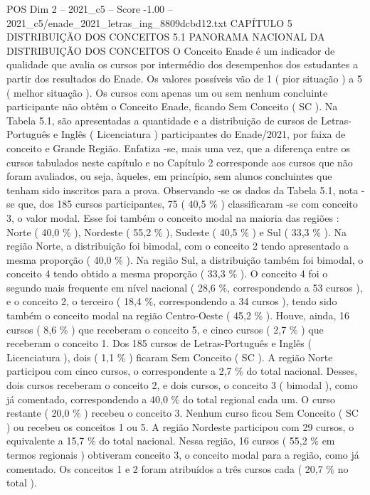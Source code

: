 \begin{textsample}{POS Dim 2 – 2021\_c5 – Score -1.00 – 2021\_c5/enade\_2021\_letras\_ing\_8809dcbd12.txt}  \label{ex:f2_pos_290}
CAPÍTULO 5 DISTRIBUIÇÃO DOS CONCEITOS 5.1 PANORAMA NACIONAL DA DISTRIBUIÇÃO DOS CONCEITOS O Conceito Enade é um indicador de qualidade que avalia os cursos por intermédio dos desempenhos dos estudantes a partir dos resultados do Enade.
Os valores possíveis vão de 1 ( pior situação ) a 5 ( melhor situação ).
Os cursos com apenas um ou sem nenhum concluinte participante não obtêm o Conceito Enade, ficando Sem Conceito ( SC ).
Na Tabela 5.1, são apresentadas a quantidade e a distribuição de cursos de Letras-Português e Inglês ( Licenciatura ) participantes do Enade/2021, por faixa de conceito e Grande Região.
Enfatiza -se, mais uma vez, que a diferença entre os cursos tabulados neste capítulo e no Capítulo 2 corresponde aos cursos que não foram avaliados, ou seja, àqueles, em princípio, sem alunos concluintes que tenham sido inscritos para a prova.
Observando -se os dados da Tabela 5.1, nota -se que, dos 185 cursos participantes, 75 ( 40,5 \% ) classificaram -se com conceito 3, o valor modal.
Esse foi também o conceito modal na maioria das regiões : Norte ( 40,0 \% ), Nordeste ( 55,2 \% ), Sudeste ( 40,5 \% ) e Sul ( 33,3 \% ).
Na região Norte, a distribuição foi bimodal, com o conceito 2 tendo apresentado a mesma proporção ( 40,0 \% ).
Na região Sul, a distribuição também foi bimodal, o conceito 4 tendo obtido a mesma proporção ( 33,3 \% ).
O conceito 4 foi o segundo mais frequente em nível nacional ( 28,6 \%, correspondendo a 53 cursos ), e o conceito 2, o terceiro ( 18,4 \%, correspondendo a 34 cursos ), tendo sido também o conceito modal na região Centro-Oeste ( 45,2 \% ).
Houve, ainda, 16 cursos ( 8,6 \% ) que receberam o conceito 5, e cinco cursos ( 2,7 \% ) que receberam o conceito 1.
Dos 185 cursos de Letras-Português e Inglês ( Licenciatura ), dois ( 1,1 \% ) ficaram Sem Conceito ( SC ).
A região Norte participou com cinco cursos, o correspondente a 2,7 \% do total nacional.
Desses, dois cursos receberam o conceito 2, e dois cursos, o conceito 3 ( bimodal ), como já comentado, correspondendo a 40,0 \% do total regional cada um.
O curso restante ( 20,0 \% ) recebeu o conceito 3.
Nenhum curso ficou Sem Conceito ( SC ) ou recebeu os conceitos 1 ou 5.
A região Nordeste participou com 29 cursos, o equivalente a 15,7 \% do total nacional.
Nessa região, 16 cursos ( 55,2 \% em termos regionais ) obtiveram conceito 3, o conceito modal para a região, como já comentado.
Os conceitos 1 e 2 foram atribuídos a três cursos cada ( 20,7 \% no total ).

\end{textsample}
